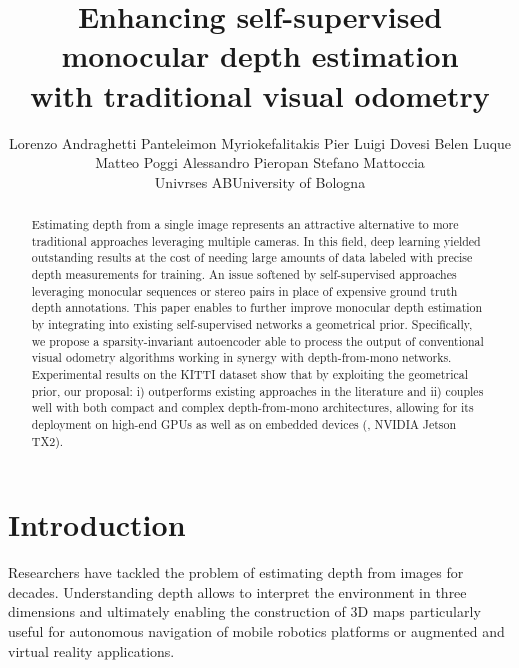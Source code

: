 \documentclass[10pt,twocolumn,letterpaper]{article}
\begin{document}
\title{Enhancing self-supervised monocular depth estimation \\with traditional visual odometry}


\author{Lorenzo Andraghetti \qquad Panteleimon Myriokefalitakis \qquad Pier Luigi Dovesi \qquad Belen Luque\\
Matteo Poggi \qquad Alessandro Pieropan \qquad Stefano Mattoccia\vspace{1em}\\
\large Univrses AB\qquad University of Bologna\\
\normalsize}

\maketitle

\label{abstract}
\begin{abstract}
Estimating depth from a single image represents an attractive alternative to more traditional approaches leveraging multiple cameras.
In this field, deep learning yielded outstanding results at the cost of needing large amounts of data labeled with precise depth measurements for training. An issue softened by self-supervised approaches leveraging monocular sequences or stereo pairs in place of expensive ground truth depth annotations.
This paper enables to further improve monocular depth estimation by integrating into existing self-supervised networks a geometrical prior. Specifically, we propose a sparsity-invariant autoencoder able to process the output of conventional visual odometry algorithms working in synergy with depth-from-mono networks. Experimental results on the KITTI dataset show that by exploiting the geometrical prior, our proposal: i) outperforms existing approaches in the literature and ii) couples well with both compact and complex depth-from-mono architectures, allowing for its deployment on high-end GPUs as well as on embedded devices (\eg, NVIDIA Jetson TX2).
\end{abstract} \section{Introduction}
\label{Introduction}

Researchers have tackled the problem of estimating depth from images for decades. Understanding depth allows to interpret the environment in three dimensions and ultimately enabling the construction of 3D maps particularly useful for autonomous navigation of mobile robotics platforms or augmented and virtual reality applications. 
\end{document}

